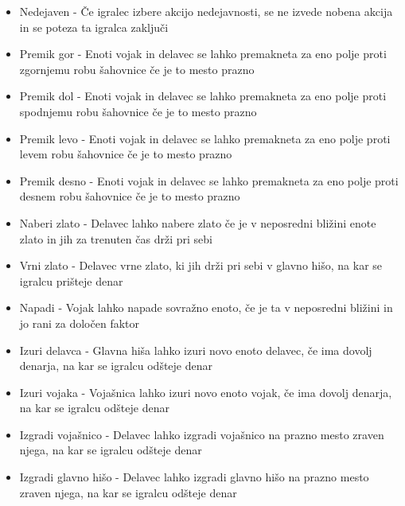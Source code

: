 \documentclass[a4paper, 12pt]{book}
\begin{document}
\begin{itemize}
	\item Nedejaven - Če igralec izbere akcijo nedejavnosti, se ne izvede nobena akcija in se poteza ta igralca zaključi 
	\item Premik gor - Enoti vojak in delavec se lahko premakneta za eno polje proti zgornjemu robu šahovnice če je to mesto prazno
	\item Premik dol  - Enoti vojak in delavec se lahko premakneta za eno polje proti spodnjemu robu šahovnice če je to mesto prazno
	\item Premik levo - Enoti vojak in delavec se lahko premakneta za eno polje proti levem robu šahovnice če je to mesto prazno
	\item Premik desno - Enoti vojak in delavec se lahko premakneta za eno polje proti desnem robu šahovnice če je to mesto prazno
	\item Naberi zlato - Delavec lahko nabere zlato če je v neposredni bližini enote zlato in jih za trenuten čas drži pri sebi 
	\item Vrni zlato - Delavec vrne zlato, ki jih drži pri sebi v glavno hišo, na kar se igralcu prišteje denar
	\item Napadi - Vojak lahko napade sovražno enoto, če je ta v neposredni bližini in jo rani za določen faktor
	\item Izuri delavca - Glavna hiša lahko izuri novo enoto delavec, če ima dovolj denarja, na kar se igralcu odšteje denar
	\item Izuri vojaka - Vojašnica lahko izuri novo enoto vojak, če ima dovolj denarja, na kar se igralcu odšteje denar
	\item Izgradi vojašnico - Delavec lahko izgradi vojašnico na prazno mesto zraven njega, na kar se igralcu odšteje denar
	\item Izgradi glavno hišo - Delavec lahko izgradi glavno hišo na prazno mesto zraven njega, na kar se igralcu odšteje denar
\end{itemize}
\end{document}
